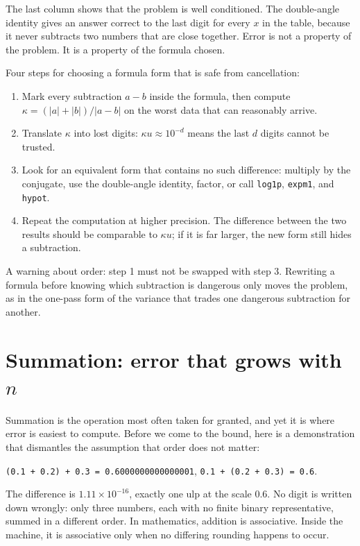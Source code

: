 The last column shows that the problem is well conditioned. The double-angle identity
gives an answer correct to the last digit for every $x$ in the table, because it never
subtracts two numbers that are close together. Error is not a property of the problem.
It is a property of the formula chosen.

\begin{resep}
Four steps for choosing a formula form that is safe from cancellation:
\begin{enumerate}
  \item Mark every subtraction $a-b$ inside the formula, then compute
        $\kappa=(|a|+|b|)/|a-b|$ on the worst data that can reasonably arrive.
  \item Translate $\kappa$ into lost digits: $\kappa u\approx10^{-d}$
        means the last $d$ digits cannot be trusted.
  \item Look for an equivalent form that contains no such difference: multiply by the
        conjugate, use the double-angle identity, factor, or call \texttt{log1p},
        \texttt{expm1}, and \texttt{hypot}.
  \item Repeat the computation at higher precision. The difference between the two
        results should be comparable to $\kappa u$; if it is far larger, the new form
        still hides a subtraction.
\end{enumerate}
A warning about order: step 1 must not be swapped with step 3. Rewriting a formula
before knowing which subtraction is dangerous only moves the problem, as in the one-pass
form of the variance that trades one dangerous subtraction for another.
\end{resep}
\section{Summation: error that grows with $n$}

Summation is the operation most often taken for granted, and yet it is where error is
easiest to compute. Before we come to the bound, here is a demonstration that dismantles
the assumption that order does not matter:

\begin{center}
\texttt{(0.1 + 0.2) + 0.3 = 0.6000000000000001}, \quad
\texttt{0.1 + (0.2 + 0.3) = 0.6}.
\end{center}

The difference is $1.11\times10^{-16}$, exactly one ulp at the scale $0.6$. No digit is
written down wrongly: only three numbers, each with no finite binary
representative, summed in a different order. In mathematics, addition is
associative. Inside the machine, it is associative only when no differing rounding
happens to occur.

